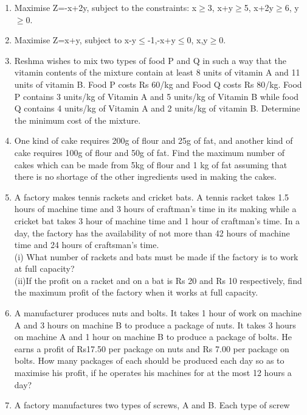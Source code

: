 \begin{enumerate}[label=\arabic*.,ref=\thesection.\theenumi]
\item Maximise Z=-x+2y, subject to the constraints:
x$\geq$3, x+y$\geq$5, x+2y$\geq$6, y$\geq$0.\\
\item Maximise Z=x+y, subject to x-y$\leq$-1,-x+y$\leq$0, x,y$\geq$0.\\
\item Reshma wishes to mix two types of food P and Q in such a way that the vitamin
contents of the mixture contain at least 8 units of vitamin A and 11 units of
vitamin B. Food P costs Rs 60/kg and Food Q costs Rs 80/kg. Food P contains
3 units/kg of Vitamin A and 5 units/kg of Vitamin B while food Q contains
4 units/kg of Vitamin A and 2 units/kg of vitamin B. Determine the minimum cost
of the mixture.\\
\item One kind of cake requires 200g of flour and 25g of fat, and another kind of cake
requires 100g of flour and 50g of fat. Find the maximum number of cakes which
can be made from 5kg of flour and 1 kg of fat assuming that there is no shortage
of the other ingredients used in making the cakes.\\
\item A factory makes tennis rackets and cricket bats. A tennis racket takes 1.5 hours
of machine time and 3 hours of craftman’s time in its making while a cricket bat
takes 3 hour of machine time and 1 hour of craftman’s time. In a day, the factory
has the availability of not more than 42 hours of machine time and 24 hours of
craftsman’s time.\\
(i) What number of rackets and bats must be made if the factory is to work
at full capacity?\\
(ii)If the profit on a racket and on a bat is Rs 20 and Rs 10 respectively, find
the maximum profit of the factory when it works at full capacity.\\
\item A manufacturer produces nuts and bolts. It takes 1 hour of work on machine A
and 3 hours on machine B to produce a package of nuts. It takes 3 hours on
machine A and 1 hour on machine B to produce a package of bolts. He earns a
profit of Rs17.50 per package on nuts and Rs 7.00 per package on bolts. How
many packages of each should be produced each day so as to maximise his
profit, if he operates his machines for at the most 12 hours a day?\\
\item A factory manufactures two types of screws, A and B. Each type of screw

\end{enumerate}
